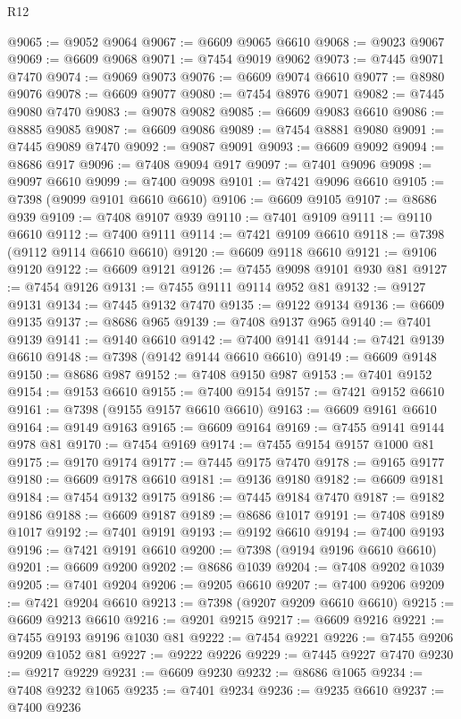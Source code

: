 \begin{lexlean}{R12}
\begin{coremodule}
{{{{{{{{{{{{{{{{{{{{{{{{{{{{{{{{{{{{{{{{{{{{{{{{{{{{{{{{{{{{{{{{{{{{{{{{{{{{{{{{{{@9065 := @9052 @9064
@9067 := @6609 @9065 @6610
@9068 := @9023 @9067
@9069 := @6609 @9068
@9071 := @7454 @9019 @9062
@9073 := @7445 @9071 @7470
@9074 := @9069 @9073
@9076 := @6609 @9074 @6610
@9077 := @8980 @9076
@9078 := @6609 @9077
@9080 := @7454 @8976 @9071
@9082 := @7445 @9080 @7470
@9083 := @9078 @9082
@9085 := @6609 @9083 @6610
@9086 := @8885 @9085
@9087 := @6609 @9086
@9089 := @7454 @8881 @9080
@9091 := @7445 @9089 @7470
@9092 := @9087 @9091
@9093 := @6609 @9092
@9094 := @8686 @917
@9096 := @7408 @9094 @917
@9097 := @7401 @9096
@9098 := @9097 @6610
@9099 := @7400 @9098
@9101 := @7421 @9096 @6610
@9105 := @7398 (@9099 @9101 @6610 @6610)
@9106 := @6609 @9105
@9107 := @8686 @939
@9109 := @7408 @9107 @939
@9110 := @7401 @9109
@9111 := @9110 @6610
@9112 := @7400 @9111
@9114 := @7421 @9109 @6610
@9118 := @7398 (@9112 @9114 @6610 @6610)
@9120 := @6609 @9118 @6610
@9121 := @9106 @9120
@9122 := @6609 @9121
@9126 := @7455 @9098 @9101 @930 @81
@9127 := @7454 @9126
@9131 := @7455 @9111 @9114 @952 @81
@9132 := @9127 @9131
@9134 := @7445 @9132 @7470
@9135 := @9122 @9134
@9136 := @6609 @9135
@9137 := @8686 @965
@9139 := @7408 @9137 @965
@9140 := @7401 @9139
@9141 := @9140 @6610
@9142 := @7400 @9141
@9144 := @7421 @9139 @6610
@9148 := @7398 (@9142 @9144 @6610 @6610)
@9149 := @6609 @9148
@9150 := @8686 @987
@9152 := @7408 @9150 @987
@9153 := @7401 @9152
@9154 := @9153 @6610
@9155 := @7400 @9154
@9157 := @7421 @9152 @6610
@9161 := @7398 (@9155 @9157 @6610 @6610)
@9163 := @6609 @9161 @6610
@9164 := @9149 @9163
@9165 := @6609 @9164
@9169 := @7455 @9141 @9144 @978 @81
@9170 := @7454 @9169
@9174 := @7455 @9154 @9157 @1000 @81
@9175 := @9170 @9174
@9177 := @7445 @9175 @7470
@9178 := @9165 @9177
@9180 := @6609 @9178 @6610
@9181 := @9136 @9180
@9182 := @6609 @9181
@9184 := @7454 @9132 @9175
@9186 := @7445 @9184 @7470
@9187 := @9182 @9186
@9188 := @6609 @9187
@9189 := @8686 @1017
@9191 := @7408 @9189 @1017
@9192 := @7401 @9191
@9193 := @9192 @6610
@9194 := @7400 @9193
@9196 := @7421 @9191 @6610
@9200 := @7398 (@9194 @9196 @6610 @6610)
@9201 := @6609 @9200
@9202 := @8686 @1039
@9204 := @7408 @9202 @1039
@9205 := @7401 @9204
@9206 := @9205 @6610
@9207 := @7400 @9206
@9209 := @7421 @9204 @6610
@9213 := @7398 (@9207 @9209 @6610 @6610)
@9215 := @6609 @9213 @6610
@9216 := @9201 @9215
@9217 := @6609 @9216
@9221 := @7455 @9193 @9196 @1030 @81
@9222 := @7454 @9221
@9226 := @7455 @9206 @9209 @1052 @81
@9227 := @9222 @9226
@9229 := @7445 @9227 @7470
@9230 := @9217 @9229
@9231 := @6609 @9230
@9232 := @8686 @1065
@9234 := @7408 @9232 @1065
@9235 := @7401 @9234
@9236 := @9235 @6610
@9237 := @7400 @9236
}}}}}}}}}}}}}}}}}}}}}}}}}}}}}}}}}}}}}}}}}}}}}}}}}}}}}}}}}}}}}}}}}}}}}}}}}}}}}}}}}}
\end{coremodule}
\end{lexlean}
